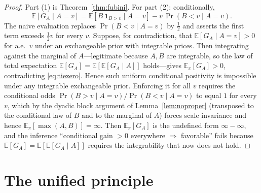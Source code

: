 \documentclass{amsart}
\theoremstyle{plain}
\theoremstyle{definition}
\begin{document}
\begin{proof}
Part (1) is Theorem~\ref{thm:fubini}. For part (2): conditionally,
\[
\mathbb E[G_A\mid A=v]
=\mathbb E[B\,\mathbf 1_{B>v}\mid A=v]-v\,\Pr(B<v\mid A=v).
\]
The naive evaluation replaces $\Pr(B<v\mid A=v)$ by $\tfrac12$ and asserts the
first term exceeds $\tfrac12 v$ for every $v$. Suppose, for contradiction, that
$\mathbb E[G_A\mid A=v]>0$ for a.e.\ $v$ under an exchangeable prior with
integrable prices. Then integrating against the marginal of $A$---legitimate
because $A,B$ are integrable, so the law of total expectation
$\mathbb E[G_A]=\mathbb E[\mathbb E[G_A\mid A]]$ holds---gives
$\mathbb E_\pi[G_A]>0$, contradicting \eqref{eq:tiezero}. Hence such uniform
conditional positivity is impossible under any integrable exchangeable prior.
Enforcing it for all $v$ requires the conditional odds
$\Pr(B>v\mid A=v)/\Pr(B<v\mid A=v)$ to equal $1$ for every $v$, which by the
dyadic block argument of Lemma~\ref{lem:noproper} (transposed to the conditional
law of $B$ and to the marginal of $A$) forces scale invariance and hence
$\mathbb E_\pi[\max(A,B)]=\infty$. Then $\mathbb E_\pi[G_A]$ is the undefined
form $\infty-\infty$, and the inference ``conditional gain $>0$ everywhere
$\Rightarrow$ favorable'' fails because
$\mathbb E[G_A]=\mathbb E[\mathbb E[G_A\mid A]]$ requires the integrability that
now does not hold.
\end{proof}

\section{The unified principle}
\end{document}
